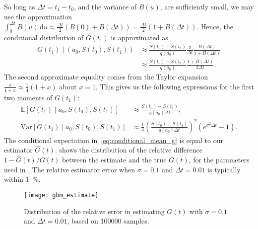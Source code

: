 \documentclass[main.tex]{subfiles}
\begin{document}
So long as $\Delta t=t_1-t_0$, and the variance of $B(u)$, are
sufficiently small, we may use the approximation
$\int_{0}^{\Delta{t}}B(u)\,\mathrm{d}u\approx  \frac{\Delta
  t}{2}(B(0)+B(\Delta t))=\frac{\Delta
  t}{2}(1+B(\Delta t))$.
Hence, the conditional distribution of $G(t_1)$ is approximated as
\begin{align}
  G(t_1)\mid (a_0,S(t_0),S(t_1))
  &\approx
    \frac{S(t_0)-S(t_1)}{q(a_0)}\frac{2}{\Delta t}\frac{B(\Delta t)}{1+B(\Delta t)}\\
  &\approx \frac{S(t_0)-S(t_1)}{q(a_0)}\frac{1+B(\Delta t)}{2\Delta t}.
\end{align}
The second approximate equality comes from the Taylor
expansion $\frac{x}{1+x}\approx \frac{1}{4}(1+x)$ about $x=1$.
This gives us the following expressions for the first two moments
of $G(t_1)$:
\begin{align}\label{eq:conditional_mean_g}
  \mathbb E[G(t_1)\mid a_0,S(t_0),S(t_1)]
  &\approx \frac{S(t_0)-S(t_1)}{ q(a_0)\Delta t},\\
  \mbox{Var}[G(t_1)\mid a_0,S(t_0),S(t_1)]
  &\approx \frac{1}{4}{\left(\frac{S(t_0)-S(t_1)}{
    q(a_0)\Delta t}\right)}^2\left( e^{\sigma^2\Delta t} -1 \right).
\end{align}
The conditional expectation in~\eqref{eq:conditional_mean_g} is equal
to our estimator $\hat G(t)$.
 shows the distribution of the relative
difference $1-\hat G(t)/G(t)$ between
the estimate and the true $G(t)$, for
the parameters used in . The relative
estimator error when $\sigma=0.1$ and $\Delta t=0.01$
is typically within \SI{1}{\percent}.
\begin{figure}[htbp]
  \centering
  \texttt{[image: gbm\_estimate]}
  \caption{Distribution of the relative error in estimating $G(t)$ with
    $\sigma=0.1$ and $\Delta t= 0.01$, based on \num{100000} samples.}\label{fig:gbm_estimate}
\end{figure}
\end{document}
